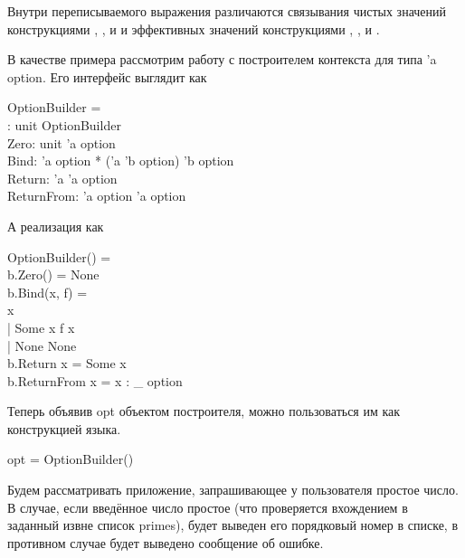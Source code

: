 Внутри переписываемого выражения различаются связывания чистых значений конструкциями \<\>, \<\>, \<\> и \<\> и эффективных значений конструкциями \<\>, \<\>, \<\> и \<\>.

В качестве примера рассмотрим работу с построителем контекста для типа \<'a option\>. Его интерфейс выглядит как

\begin{haskell}
 OptionBuilder = \\
\quad\quad {}: unit \to OptionBuilder \\
\quad\quad {} Zero: unit \to 'a option \\
\quad\quad {} Bind: 'a option * ('a \to 'b option) \to 'b option \\
\quad\quad {} Return: 'a \to 'a option \\
\quad\quad {} ReturnFrom: 'a option \to 'a option
\end{haskell}

А реализация как

\begin{haskell}
 OptionBuilder() = \\
\quad\quad {} b.Zero() = None \\
\quad\quad {} b.Bind(x, f) = \\
\quad\quad\quad\quad {} x  \\
\quad\quad\quad\quad\quad\quad | Some x \to f x \\
\quad\quad\quad\quad\quad\quad | None \to None \\
\quad\quad {} b.Return x = Some x \\
\quad\quad {} b.ReturnFrom x = x : \_ option
\end{haskell}

Теперь объявив \<opt\> объектом построителя, можно пользоваться им как конструкцией языка.

\begin{haskell}
 opt = OptionBuilder()
\end{haskell}

Будем рассматривать приложение, запрашивающее у пользователя простое число. В случае, если введённое число простое (что проверяется вхождением в заданный извне список \<primes\>), будет выведен его порядковый номер в списке, в противном случае будет выведено сообщение об ошибке.

